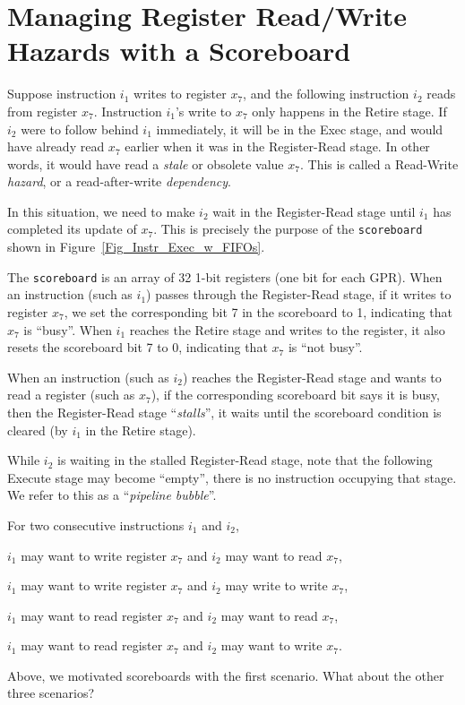 \section{Managing Register Read/Write Hazards with a Scoreboard}

\label{Sec_Scoreboards}


Suppose instruction $i_1$ writes to register $x_7$, and the following
instruction $i_2$ reads from register $x_7$.  Instruction $i_1$'s
write to $x_7$ only happens in the Retire stage.  If $i_2$ were to
follow behind $i_1$ immediately, it will be in the Exec stage, and
would have already read $x_7$ earlier when it was in the Register-Read
stage.  In other words, it would have read a \emph{stale} or obsolete
value $x_7$.  This is called a Read-Write \emph{hazard}, or a
read-after-write \emph{dependency}.

In this situation, we need to make $i_2$ wait in the Register-Read
stage until $i_1$ has completed its update of $x_7$.  This is
precisely the purpose of the \verb|scoreboard| shown in
Figure~\ref{Fig_Instr_Exec_w_FIFOs}.

The \verb|scoreboard| is an array of 32 1-bit registers (one bit for
each GPR).  When an instruction (such as $i_1$) passes through the
Register-Read stage, if it writes to register $x_7$, we set the
corresponding bit 7 in the scoreboard to 1, indicating that $x_7$ is
``busy''.  When $i_1$ reaches the Retire stage and writes to the
register, it also resets the scoreboard bit 7 to 0, indicating that
$x_7$ is ``not busy''.

When an instruction (such as $i_2$) reaches the Register-Read stage
and wants to read a register (such as $x_7$), if the corresponding
scoreboard bit says it is busy, then the Register-Read stage
``\emph{stalls}'', {\ie} it waits until the scoreboard condition is
cleared (by $i_1$ in the Retire stage).


While $i_2$ is waiting in the stalled Register-Read stage, note that
the following Execute stage may become ``empty'', {\ie} there is no
instruction occupying that stage.  We refer to this as a
``\emph{pipeline bubble}''.

\hdivider

\Exercise

For two consecutive instructions $i_1$ and $i_2$,
  \begin{tightlist}
    \item $i_1$ may want to write register $x_7$ and $i_2$ may want to read $x_7$,
    \item $i_1$ may want to write register $x_7$ and $i_2$ may write to write $x_7$,
    \item $i_1$ may want to read register $x_7$ and $i_2$ may want to read $x_7$,
    \item $i_1$ may want to read register $x_7$ and $i_2$ may want to write $x_7$.
  \end{tightlist}
Above, we motivated scoreboards with the first scenario.  What about
the other three scenarios?

